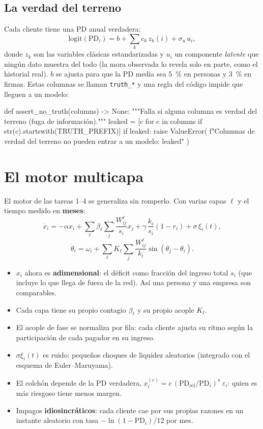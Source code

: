 \subsection{La verdad del terreno}
Cada cliente tiene una PD anual verdadera:
\[
\mathrm{logit}(\mathrm{PD}_i) = b + \sum_k c_k\,z_k(i) + \sigma_u\,u_i,
\]
donde $z_k$ son las variables clásicas estandarizadas y $u_i$ un componente
\emph{latente} que ningún dato muestra del todo (la mora observada lo revela solo en
parte, como el historial real). $b$ se ajusta para que la PD media sea 5~\% en personas
y 3~\% en firmas. Estas columnas se llaman \texttt{truth\_*} y una regla del código
impide que lleguen a un modelo:

\begin{codigo}[label=src/pulso/schema.py]
def assert_no_truth(columns) -> None:
    """Falla si alguna columna es verdad del terreno (fuga de información)."""
    leaked = [c for c in columns if str(c).startswith(TRUTH_PREFIX)]
    if leaked:
        raise ValueError(
            f"Columnas de verdad del terreno no pueden entrar a un modelo: {leaked}"
        )
\end{codigo}

\section{El motor multicapa}
El motor de las tareas 1–4 se generaliza sin romperlo. Con varias capas $\ell$ y el
tiempo medido en \textbf{meses}:
\[
\dot x_i = -\alpha x_i + \sum_\ell \beta_\ell\sum_j\frac{W^\ell_{ij}}{s_i}x_j
+ \gamma\,\frac{k_i}{s_i}(1-r_i) + \sigma\,\xi_i(t),
\]
\[
\dot\theta_i = \omega_i + \sum_\ell K_\ell \sum_j \frac{W^\ell_{ij}}{k_i}\sin(\theta_j-\theta_i).
\]
\begin{itemize}
\item $x_i$ ahora es \textbf{adimensional}: el déficit como fracción del ingreso total
$s_i$ (que incluye lo que llega de fuera de la red). Así una persona y una empresa son
comparables.
\item Cada capa tiene su propio contagio $\beta_\ell$ y su propio acople $K_\ell$.
\item El acople de fase se normaliza por fila: cada cliente ajusta su ritmo según la
participación de cada pagador en su ingreso.
\item $\sigma\xi_i(t)$ es ruido: pequeños choques de liquidez aleatorios (integrado con
el esquema de Euler–Maruyama).
\item El colchón depende de la PD verdadera,
$x_i^{(c)} = c\,(\mathrm{PD}_\text{ref}/\mathrm{PD}_i)^{\kappa}\,\varepsilon_i$: quien
es más riesgoso tiene menos margen.
\item Impagos \textbf{idiosincráticos}: cada cliente cae por sus propias razones en un
instante aleatorio con tasa $-\ln(1-\mathrm{PD}_i)/12$ por mes.
\end{itemize}


